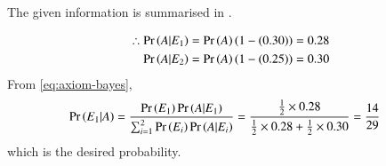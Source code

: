 The given information is summarised in 
.
\begin{table}[htb]
	\centering

\caption{}
\label{tab:ncert/12/13/6/13/1}
\end{table}
%
\begin{align}
	\therefore	\pr{A|E_1} &= \pr{A}(1-(0.30))
	 =  0.28
	\label{eq:ncert/12/13/6/13/4}
	\\
	\pr{A|E_2} &= \pr{A}(1-(0.25))
	=  0.30
	\label{eq:ncert/12/13/6/13/5}
\end{align}
From 
\eqref{eq:axiom-bayes},
\begin{align}
	\Pr\left(E_1|A\right) &= \frac{\Pr\left(E_1\right)\Pr\left(A|E_1\right)}{\sum_{i=1}^{2}\Pr\left(E_i\right)\Pr\left(A|E_i\right)}
	= \frac{\frac{1}{2}\times 0.28}{\frac{1}{2}\times 0.28 + \frac{1}{2}\times 0.30}
	= \frac{14}{29}
\end{align}
which is the desired probability.
